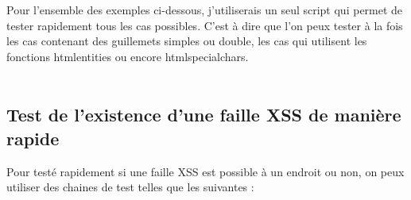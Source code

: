 \documentclass{article}
\begin{document}
Pour l'ensemble des exemples ci-dessous, j'utiliserais un seul script qui permet de tester rapidement tous les cas possibles. C'est à dire que l'on peux tester à la fois les cas contenant des guillemets simples ou double, les cas qui utilisent les fonctions htmlentities ou encore htmlspecialchars.
\vspace{0.2cm}\\
\vspace{0.2cm}\\

\subsection{Test de l'existence d'une faille XSS de manière rapide}
Pour testé rapidement si une faille XSS est possible à un endroit ou non, on peux utiliser des chaines de test telles que les suivantes :
\vspace{0.2cm}\\
\vspace{0.2cm}
\end{document}
